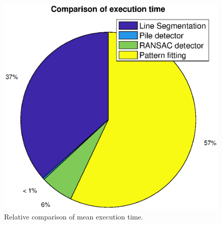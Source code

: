 \begin{figure}[H]
	\centering
	\includegraphics[scale=0.65]{fig/time.eps}
	\caption[Experiment time comparison]{Relative comparison of mean execution time.}
	\label{fig:time}
\end{figure}

